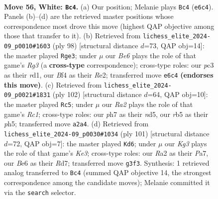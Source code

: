 \documentclass[11pt]{article}
\begin{document}
\clearpage

\begin{figure}[p]\centering
\begin{subfigure}{0.46\textwidth}\centering
\resizebox{\linewidth}{!}{%
\newchessgame
\chessboard[
  setfen={5b1r/p4nkp/P3B3/1r6/5B2/1Pp3KP/R1P3P1/R7 w - - 19 56},
  showmover=false,
  pgfstyle=straightmove, color=movearrow, markmove={e6-c4}
]}
\caption{}
\end{subfigure}\hfill
\begin{subfigure}{0.46\textwidth}\centering
\resizebox{\linewidth}{!}{%
\newchessgame
\chessboard[
  setfen={8/7p/1p3rbk/1B6/P7/6RP/4RPPK/3r4 w - - 15 50},
  showmover=false,
  pgfstyle=straightmove, color=movearrow, markmove={g3-e3}
]}
\caption{}
\end{subfigure}
\\[4pt]
\begin{subfigure}{0.46\textwidth}\centering
\resizebox{\linewidth}{!}{%
\newchessgame
\chessboard[
  setfen={r7/P1p1rk2/8/1P1n2pp/3B4/7P/5PPK/R1R5 w - - 4 52},
  showmover=false,
  pgfstyle=straightmove, color=movearrow, markmove={c1-c5}
]}
\caption{}
\end{subfigure}\hfill
\begin{subfigure}{0.46\textwidth}\centering
\resizebox{\linewidth}{!}{%
\newchessgame
\chessboard[
  setfen={2r5/p2rp2p/4k3/5pBB/2b5/3p3P/P5RK/4R3 b - - 13 51},
  showmover=false,
  pgfstyle=straightmove, color=movearrow, markmove={e6-d6}
]}
\caption{}
\end{subfigure}
\caption{\textbf{Move 56, White: \texttt{Bc4}.} (a) Our position; Melanie plays \texttt{Bc4} (\texttt{e6c4}). Panels (b)--(d) are the retrieved master positions whose correspondence most drove this move (highest QAP objective among those that transfer to it). (b) Retrieved from \texttt{lichess\_elite\_2024-09\_p0010\#1603} (ply 98) [structural distance $d$=73, QAP obj=14]: the master played \texttt{Rge3}; under $\mu$ our \emph{Be6} plays the role of that game's \emph{Rg3} (a \textbf{cross-type} correspondence); cross-type roles: our \emph{p}c3 as their \emph{r}d1, our \emph{B}f4 as their \emph{R}e2; transferred move \texttt{e6c4} \textbf{(endorses this move)}. (c) Retrieved from \texttt{lichess\_elite\_2024-09\_p0021\#1831} (ply 102) [structural distance $d$=64, QAP obj=10]: the master played \texttt{Rc5}; under $\mu$ our \emph{Ra2} plays the role of that game's \emph{Rc1}; cross-type roles: our \emph{p}h7 as their \emph{n}d5, our \emph{r}b5 as their \emph{p}h5; transferred move \texttt{a2a4}. (d) Retrieved from \texttt{lichess\_elite\_2024-09\_p0030\#1034} (ply 101) [structural distance $d$=72, QAP obj=7]: the master played \texttt{Kd6}; under $\mu$ our \emph{Kg3} plays the role of that game's \emph{Ke3}; cross-type roles: our \emph{R}a2 as their \emph{P}a7, our \emph{B}e6 as their \emph{R}d7; transferred move \texttt{g3f3}. Synthesis: 1 retrieved analog transferred to \texttt{Bc4} (summed QAP objective 14, the strongest correspondence among the candidate moves); Melanie committed it via the \texttt{search} selector.}
\label{fig:thought-m110}
\end{figure}
\end{document}
